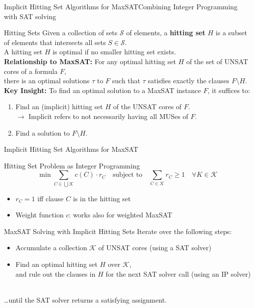 \documentclass[t,english]{sdqbeamer}
\begin{document}
\begin{frame}{Implicit Hitting Set Algorithms for MaxSAT}{Combining Integer Programming with SAT solving}
\begin{block}{Hitting Sets}
Given a collection of sets $\mathcal{S}$ of elements, a \textbf{hitting set} $H$ is a subset of elements that intersects all sets $S \in \mathcal{S}$.\\
A hitting set $H$ is optimal if no smaller hitting set exists.\\[1em]
\textbf{Relationship to MaxSAT:}
For any optimal hitting set $H$ of the set of UNSAT cores of a formula $F$,\\
there is an optimal solutions $\tau$ to $F$ such that $\tau$ satisfies exactly the clauses $F \setminus H$.\\[1em]
\textbf{Key Insight:}
To find an optimal solution to a MaxSAT instance $F$, it suffices to:\\[1ex]
\begin{enumerate}
	\item Find an (implicit) hitting set $H$ of the UNSAT cores of $F$.\\
	$\rightarrow$ Implicit refers to not necessarily having all MUSes of $F$.
	\item Find a solution to $F \setminus H$.
\end{enumerate}
\end{block}
\end{frame}

\begin{frame}{Implicit Hitting Set Algorithms for MaxSAT}
\begin{block}{Hitting Set Problem as Integer Programming}
$$
\min\sum_{C \in \bigcup \mathcal{K}} c(C) \cdot r_C \quad \text{subject to} \quad \sum_{C \in \mathcal{K}} r_C \geq 1 \quad \forall K \in \mathcal{K}
$$
\begin{itemize}\itemsep1ex
	\item $r_C = 1$ iff clause $C$ is in the hitting set
	\item Weight function $c$: works also for weighted MaxSAT
\end{itemize}
\end{block}
\begin{block}{MaxSAT Solving with Implicit Hitting Sets}
Iterate over the following steps:\\[1ex]
\begin{itemize}\itemsep1ex
	\item Accumulate a collection $\mathcal{K}$ of UNSAT cores
	\hfill (using a SAT solver)
	\item Find an optimal hitting set $H$ over $\mathcal{K}$,\\ 
	and rule out the clauses in $H$ for the next SAT solver call
	\hfill (using an IP solver)
\end{itemize}~\\
\dots until the SAT solver returns a satisfying assignment.
\end{block}
\end{frame}
\end{document}
